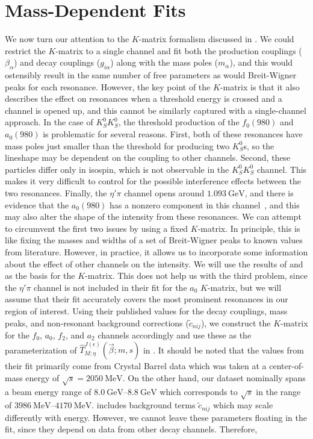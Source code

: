 \section{Mass-Dependent Fits}\label{sec:mass-dependent-fits}

We now turn our attention to the $K$-matrix formalism discussed in . We could restrict the $K$-matrix to a single channel and fit both the production couplings ($\beta_\alpha$) and decay couplings ($g_{i\alpha}$) along with the mass poles ($m_\alpha$), and this would ostensibly result in the same number of free parameters as would Breit-Wigner peaks for each resonance. However, the key point of the $K$-matrix is that it also describes the effect on resonances when a threshold energy is crossed and a channel is opened up, and this cannot be similarly captured with a single-channel approach. In the case of $K_S^0K_S^0$, the threshold production of the $f_0(980)$ and $a_0(980)$ is problematic for several reasons. First, both of these resonances have mass poles just smaller than the threshold for producing two $K_S^0$s, so the lineshape may be dependent on the coupling to other channels. Second, these particles differ only in isospin, which is not observable in the $K_S^0K_S^0$ channel. This makes it very difficult to control for the possible interference effects between the two resonances. Finally, the $\eta'\pi$ channel opens around $\SI{1.093}{\giga\electronvolt}$, and there is evidence that the $a_0(980)$ has a nonzero component in this channel~\cite{Ablikim2017,Chen2020}, and this may also alter the shape of the intensity from these resonances. We can attempt to circumvent the first two issues by using a fixed $K$-matrix. In principle, this is like fixing the masses and widths of a set of Breit-Wigner peaks to known values from literature. However, in practice, it allows us to incorporate some information about the effect of other channels on the intensity. We will use the results of \cite{Albrecht2020} and \cite{Kopf2021} as the basis for the $K$-matrix. This does not help us with the third problem, since the $\eta'\pi$ channel is not included in their fit for the $a_0$ $K$-matrix, but we will assume that their fit accurately covers the most prominent resonances in our region of interest. Using their published values for the decay couplings, mass peaks, and non-resonant background corrections ($\tilde{c}_{nij}$), we construct the $K$-matrix for the $f_0$, $a_0$, $f_2$, and $a_2$ channels accordingly and use these as the parameterization of $\hat{T}_{M;\eta}^{J(\epsilon)}(\vec{\beta};m,s)$ in . It should be noted that the values from their fit primarily come from Crystal Barrel data which was taken at a center-of-mass energy of $\sqrt{s} = \SI{2050}{\mega\electronvolt}$. On the other hand, our dataset nominally spans a beam energy range of $\qtyrange{8.0}{8.8}{\giga\electronvolt}$ which corresponds to $\sqrt{s}$ in the range of $\qtyrange{3986}{4170}{\mega\electronvolt}$.  includes background terms $\tilde{c}_{nij}$ which may scale differently with energy. However, we cannot leave these parameters floating in the fit, since they depend on data from other decay channels. Therefore, 